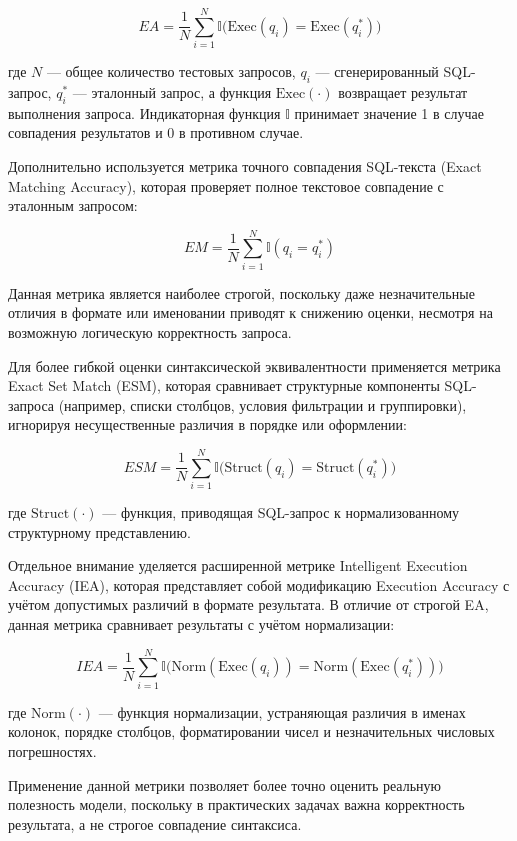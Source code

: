 \begin{equation}
EA = \frac{1}{N} \sum_{i=1}^{N} \mathbb{I}\big( \text{Exec}(q_i) = \text{Exec}(q_i^{*}) \big)
\end{equation}

где $N$ — общее количество тестовых запросов, $q_i$ — сгенерированный SQL-запрос, $q_i^{*}$ — эталонный запрос, а функция $\text{Exec}(\cdot)$ возвращает результат выполнения запроса. Индикаторная функция $\mathbb{I}$ принимает значение 1 в случае совпадения результатов и 0 в противном случае.

Дополнительно используется метрика точного совпадения SQL-текста (Exact Matching Accuracy), которая проверяет полное текстовое совпадение с эталонным запросом:

\begin{equation}
EM = \frac{1}{N} \sum_{i=1}^{N} \mathbb{I}(q_i = q_i^{*})
\end{equation}

Данная метрика является наиболее строгой, поскольку даже незначительные отличия в формате или именовании приводят к снижению оценки, несмотря на возможную логическую корректность запроса.

Для более гибкой оценки синтаксической эквивалентности применяется метрика Exact Set Match (ESM), которая сравнивает структурные компоненты SQL-запроса (например, списки столбцов, условия фильтрации и группировки), игнорируя несущественные различия в порядке или оформлении:

\begin{equation}
ESM = \frac{1}{N} \sum_{i=1}^{N} \mathbb{I}\big( \text{Struct}(q_i) = \text{Struct}(q_i^{*}) \big)
\end{equation}

где $\text{Struct}(\cdot)$ — функция, приводящая SQL-запрос к нормализованному структурному представлению.

Отдельное внимание уделяется расширенной метрике Intelligent Execution Accuracy (IEA), которая представляет собой модификацию Execution Accuracy с учётом допустимых различий в формате результата. В отличие от строгой EA, данная метрика сравнивает результаты с учётом нормализации:

\begin{equation}
IEA = \frac{1}{N} \sum_{i=1}^{N} \mathbb{I}\big( \text{Norm}(\text{Exec}(q_i)) = \text{Norm}(\text{Exec}(q_i^{*})) \big)
\end{equation}

где $\text{Norm}(\cdot)$ — функция нормализации, устраняющая различия в именах колонок, порядке столбцов, форматировании чисел и незначительных числовых погрешностях.

Применение данной метрики позволяет более точно оценить реальную полезность модели, поскольку в практических задачах важна корректность результата, а не строгое совпадение синтаксиса.
